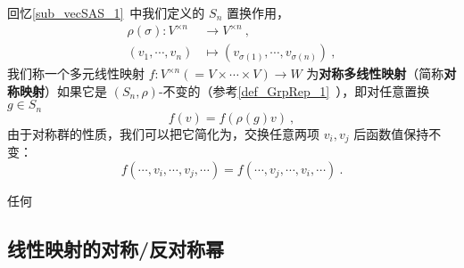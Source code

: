 
回忆\autoref{sub_vecSAS_1}~中我们定义的 $S_n$ 置换作用，
\begin{equation}
\begin{aligned}
\rho(\sigma): V^{\times n} &\to V^{\times n}~, \\
(v_1, \cdots, v_n) &\mapsto (v_{\sigma(1)}, \cdots, v_{\sigma(n)})~,
\end{aligned}
\end{equation}
我们称一个多元线性映射 $f: V^{\times n} (= V \times \cdots \times V) \to W$ 为\textbf{对称多线性映射}（简称\textbf{对称映射}）如果它是 $(S_n, \rho)$-不变的（参考\autoref{def_GrpRep_1}~），即对任意置换 $g \in S_n$
\begin{equation}
f(v) = f(\rho(g) v)~,
\end{equation}
由于对称群的性质，我们可以把它简化为，交换任意两项 $v_i, v_j$ 后函数值保持不变：
\begin{equation}
f(\cdots, v_i, \cdots, v_j, \cdots) = f(\cdots, v_j, \cdots, v_i, \cdots)~.
\end{equation}


任何



\subsection{线性映射的对称/反对称幂}




